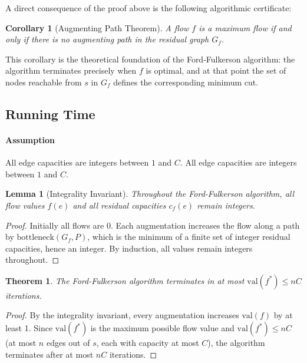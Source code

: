 \documentclass[12pt,a4paper]{report}
\newtheorem{theorem}{Theorem}
\newtheorem{lemma}{Lemma}
\newtheorem{corollary}{Corollary}
\begin{document}
A direct consequence of the proof above is the following algorithmic
certificate:

\begin{corollary}[Augmenting Path Theorem]
    A flow $f$ is a maximum flow if and only if there is no augmenting
    path in the residual graph $G_f$.
\end{corollary}

This corollary is the theoretical foundation of the Ford-Fulkerson
algorithm: the algorithm terminates precisely when $f$ is optimal,
and at that point the set of nodes reachable from $s$ in $G_f$
defines the corresponding minimum cut.

\subsection*{Running Time}

\paragraph{Assumption}
All edge capacities are integers between $1$ and $C$.
    All edge capacities are integers between $1$ and $C$.

\begin{lemma}[Integrality Invariant]
    Throughout the Ford-Fulkerson algorithm, all flow values $f(e)$ and
    all residual capacities $c_f(e)$ remain integers.
\end{lemma}

\begin{proof}
    Initially all flows are 0. Each augmentation increases the flow
    along a path by $\mathrm{bottleneck}(G_f, P)$, which is the minimum
    of a finite set of integer residual capacities, hence an integer.
    By induction, all values remain integers throughout.
\end{proof}

\begin{theorem}
    The Ford-Fulkerson algorithm terminates in at most
    $\mathrm{val}(f^*) \leq nC$ iterations.
\end{theorem}

\begin{proof}
    By the integrality invariant, every augmentation increases
    $\mathrm{val}(f)$ by at least 1. Since $\mathrm{val}(f^*)$ is the
    maximum possible flow value and $\mathrm{val}(f^*) \leq nC$
    (at most $n$ edges out of $s$, each with capacity at most $C$),
    the algorithm terminates after at most $nC$ iterations.
\end{proof}
\end{document}

